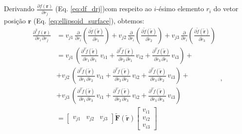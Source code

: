 Derivando $\frac{\partial f(\mathbf{r})}{\partial r_{j}}$
(Eq. \ref{eq:df_drj})com respeito ao $i$-ésimo elemento 
$r_{i}$ do vetor posição $\mathbf{r}$ (Eq. \ref{eq:ellipsoid_surface}),
obtemos:
\begin{equation}
\begin{split}
\frac{\partial^{2} f(\mathbf{r})}{\partial r_{i} \, \partial r_{j}} &=
v_{j1} \, \frac{\partial}{\partial r_{i}} 
\left( \frac{\partial \tilde{f}(\tilde{\mathbf{r}})}{\partial \tilde{r}_{1}} \right) +
v_{j2} \, \frac{\partial}{\partial r_{i}} 
\left( \frac{\partial \tilde{f}(\tilde{\mathbf{r}})}{\partial \tilde{r}_{2}} \right) +
v_{j3} \, \frac{\partial}{\partial r_{i}} 
\left( \frac{\partial \tilde{f}(\tilde{\mathbf{r}})}{\partial \tilde{r}_{3}} \right) \\
&= v_{j1} \, \left( 
\frac{\partial^{2} \tilde{f}(\tilde{\mathbf{r}})}
{\partial \tilde{r}_{1} \, \partial \tilde{r}_{1}} \, v_{i1} + 
\frac{\partial^{2} \tilde{f}(\tilde{\mathbf{r}})}
{\partial \tilde{r}_{2} \, \partial \tilde{r}_{1}} \, v_{i2} + 
\frac{\partial^{2} \tilde{f}(\tilde{\mathbf{r}})}
{\partial \tilde{r}_{3} \, \partial \tilde{r}_{1}} \, v_{i3} 
\right) + \\
&+ v_{j2} \, \left( 
\frac{\partial^{2} \tilde{f}(\tilde{\mathbf{r}})}
{\partial \tilde{r}_{1} \, \partial \tilde{r}_{2}} \, v_{i1} + 
\frac{\partial^{2} \tilde{f}(\tilde{\mathbf{r}})}
{\partial \tilde{r}_{2} \, \partial \tilde{r}_{2}} \, v_{i2} + 
\frac{\partial^{2} \tilde{f}(\tilde{\mathbf{r}})}
{\partial \tilde{r}_{3} \, \partial \tilde{r}_{2}} \, v_{i3} 
\right) + \\
&+ v_{j3} \, \left( 
\frac{\partial^{2} \tilde{f}(\tilde{\mathbf{r}})}
{\partial \tilde{r}_{1} \, \partial \tilde{r}_{3}} \, v_{i1} + 
\frac{\partial^{2} \tilde{f}(\tilde{\mathbf{r}})}
{\partial \tilde{r}_{2} \, \partial \tilde{r}_{3}} \, v_{i2} + 
\frac{\partial^{2} \tilde{f}(\tilde{\mathbf{r}})}
{\partial \tilde{r}_{3} \, \partial \tilde{r}_{3}} \, v_{i3} 
\right) \\
&= \left[ \begin{array}{ccc}
v_{j1} & v_{j2} & v_{j3}
\end{array} \right] \tilde{\mathbf{F}}(\tilde{\mathbf{r}})
\left[ \begin{array}{c}
v_{i1} \\ v_{i2} \\ v_{i3}
\end{array} \right]
\end{split} \: ,
\label{eq:d2f-dridrj}
\end{equation}
